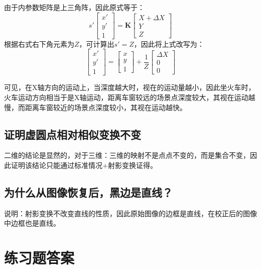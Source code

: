 \documentclass[11pt]{article}
\begin{document}
由于内参数矩阵是上三角阵，因此原式等于：
\begin{equation*}
  s'\begin{bmatrix}
    x' \\y'\\1
  \end{bmatrix}=\mathbf{K}\begin{bmatrix}
    X+\Delta X \\Y\\Z
  \end{bmatrix}
\end{equation*}
根据右式右下角元素为$Z$，可计算出$s'=Z$，因此将上式改写为：
\begin{equation*}
  \begin{bmatrix}
    x' \\y'\\1
  \end{bmatrix}=\begin{bmatrix}
    x \\y\\1
  \end{bmatrix}+\frac{1}{Z}\begin{bmatrix}
    \Delta X \\0\\0
  \end{bmatrix}
\end{equation*}\par
可见，在X轴方向的运动上，当深度越大时，视在的运动量越小，因此坐火车时，火车运动方向相当于是X轴运动，距离车窗较远的场景点深度较大，其视在运动越慢，而距离车窗较近的场景点深度较小，其视在运动越快。
\subsection{证明虚圆点相对相似变换不变}
二维的结论是显然的，对于三维：三维的映射不是点点不变的，而是集合不变，因此证明该结论只能通过标准情况+射影变换证得。
\subsection{为什么从图像恢复后，黑边是直线？}
说明：射影变换不改变直线的性质，因此原始图像的边框是直线，在校正后的图像中边框也是直线。
\section{练习题答案}
\end{document}
